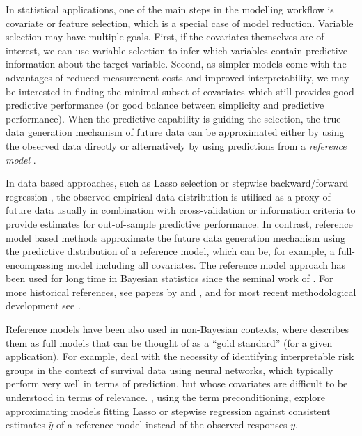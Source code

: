 \documentclass[american,]{article}
\theoremstyle{definition}
\begin{document}
In statistical applications, one of the main steps in the modelling
workflow is covariate or feature selection, which is a special case of
model reduction. Variable selection may have multiple goals.  First,
if the covariates themselves are of interest, we can use variable
selection to infer which variables contain predictive information
about the target variable.  Second, as simpler models come with the
advantages of reduced measurement costs and improved interpretability,
we may be interested in finding the minimal subset of covariates which
still provides good predictive performance (or good balance between
simplicity and predictive performance).  When the predictive
capability is guiding the selection, the true data generation
mechanism of future data can be approximated either by using the
observed data directly or alternatively by using predictions from a
\emph{reference model} \citep{vehtari2012survey}.


In data based approaches, such as Lasso selection
\citep{tibshirani1996regression} or stepwise backward/forward
regression \citep{venables2013modern,harrell2015regression}, the
observed empirical data distribution is utilised as a proxy of future
data usually in combination with cross-validation or information
criteria to provide estimates for out-of-sample predictive
performance.  In contrast, reference model based methods approximate
the future data generation mechanism using the predictive distribution
of a reference model, which can be, for example, a full-encompassing
model including all covariates. The reference model approach has been
used for long time in Bayesian statistics since the seminal work of
\citet{paper:reference_lindley}. For more historical references, see
papers by \citet{vehtari2012survey} and \citet{paper:model_selection},
and for most recent methodological development see
\citet{paper:projpred}.




Reference models have been also used in non-Bayesian contexts, where
\cite{harrell2015regression} describes them as full models that can be
thought of as a ``gold standard'' (for a given application).  For
example, \cite{faraggi2001understanding} deal with the necessity of
identifying interpretable risk groups in the context of survival data
using neural networks, which typically perform very well in terms of
prediction, but whose covariates are difficult to be understood in
terms of relevance.  \cite{paul2008preconditioning}, using the term
preconditioning, explore approximating models fitting Lasso or
stepwise regression against consistent estimates $\hat{y}$ of a
reference model instead of the observed responses $y$.
\end{document}
